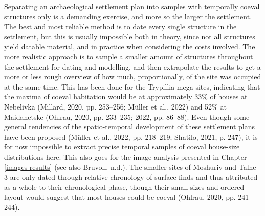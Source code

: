 \documentclass[
  12pt,
]{book}
\begin{document}
Separating an archaeological settlement plan into samples with temporally coeval structures only is a demanding exercise, and more so the larger the settlement. The best and most reliable method is to date every single structure in the settlement, but this is usually impossible both in theory, since not all structures yield datable material, and in practice when considering the costs involved. The more realistic approach is to sample a smaller amount of structures throughout the settlement for dating and modelling, and then extrapolate the results to get a more or less rough overview of how much, proportionally, of the site was occupied at the same time. This has been done for the Trypillia mega-sites, indicating that the maxima of coeval habitation would be at approximately 33\% of houses at Nebelivka (Millard, 2020, pp. 253--256; Müller et al., 2022) and 52\% at Maidanetske (Ohlrau, 2020, pp. 233--235; 2022, pp. 86--88). Even though some general tendencies of the spatio-temporal development of these settlement plans have been proposed (Müller et al., 2022, pp. 218--219; Shatilo, 2021, p. 247), it is for now impossible to extract precise temporal samples of coeval house-size distributions here. This also goes for the image analysis presented in Chapter \ref{images-results} (see also Bruvoll, n.d.). The smaller sites of Moshuriv and Talne 3 are only dated through relative chronology of surface finds and thus attributed as a whole to their chronological phase, though their small sizes and ordered layout would suggest that most houses could be coeval (Ohlrau, 2020, pp. 241--244).
\end{document}
